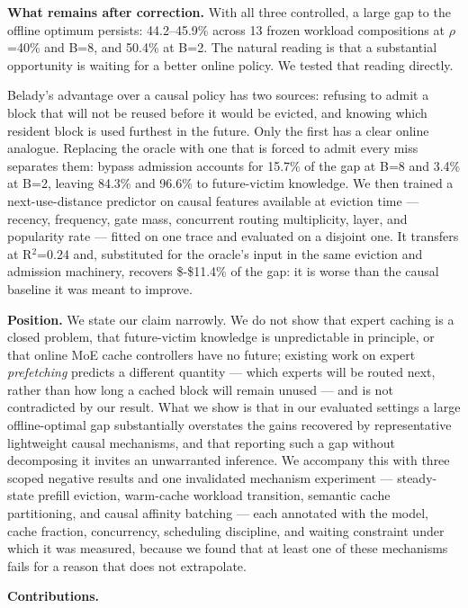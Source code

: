 \documentclass[
  10pt,
  letterpaper,
  10pt]{article}
\begin{document}
\textbf{What remains after correction.} With all three controlled, a
large gap to the offline optimum persists: 44.2--45.9\% across 13 frozen
workload compositions at \(\rho\)=40\% and B=8, and 50.4\% at B=2. The
natural reading is that a substantial opportunity is waiting for a
better online policy. We tested that reading directly.

Belady's advantage over a causal policy has two sources: refusing to
admit a block that will not be reused before it would be evicted, and
knowing which resident block is used furthest in the future. Only the
first has a clear online analogue. Replacing the oracle with one that is
forced to admit every miss separates them: bypass admission accounts for
15.7\% of the gap at B=8 and 3.4\% at B=2, leaving 84.3\% and 96.6\% to
future-victim knowledge. We then trained a next-use-distance predictor
on causal features available at eviction time --- recency, frequency,
gate mass, concurrent routing multiplicity, layer, and popularity rate
--- fitted on one trace and evaluated on a disjoint one. It transfers at
R\(^2\)=0.24 and, substituted for the oracle's input in the same
eviction and admission machinery, recovers \$-\$11.4\% of the gap: it is
worse than the causal baseline it was meant to improve.

\textbf{Position.} We state our claim narrowly. We do not show that
expert caching is a closed problem, that future-victim knowledge is
unpredictable in principle, or that online MoE cache controllers have no
future; existing work on expert \emph{prefetching} predicts a different
quantity --- which experts will be routed next, rather than how long a
cached block will remain unused --- and is not contradicted by our
result. What we show is that in our evaluated settings a large
offline-optimal gap substantially overstates the gains recovered by
representative lightweight causal mechanisms, and that reporting such a
gap without decomposing it invites an unwarranted inference. We
accompany this with three scoped negative results and one invalidated
mechanism experiment --- steady-state prefill eviction, warm-cache
workload transition, semantic cache partitioning, and causal affinity
batching --- each annotated with the model, cache fraction, concurrency,
scheduling discipline, and waiting constraint under which it was
measured, because we found that at least one of these mechanisms fails
for a reason that does not extrapolate.

\textbf{Contributions.}
\end{document}
